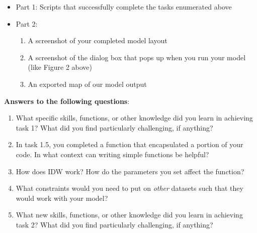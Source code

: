 \documentclass[]{article}
\providecommand{\tightlist}{%
  \setlength{\itemsep}{0pt}\setlength{\parskip}{0pt}}
\begin{document}
\begin{itemize}
\item
  Part 1: Scripts that successfully complete the tasks enumerated above
\item
  Part 2:

  \begin{enumerate}
  \def\labelenumi{\arabic{enumi}.}
  \tightlist
  \item
    A screenshot of your completed model layout
  \item
    A screenshot of the dialog box that pops up when you run your model
    (like Figure 2 above)
  \item
    An exported map of our model output
  \end{enumerate}
\end{itemize}

\textbf{Answers to the following questions}:

\begin{enumerate}
\def\labelenumi{\arabic{enumi}.}
\item
  What specific skills, functions, or other knowledge did you learn in
  achieving task 1? What did you find particularly challenging, if
  anything?
\item
  In task 1.5, you completed a function that encapsulated a portion of
  your code. In what context can writing simple functions be helpful?
\item
  How does IDW work? How do the parameters you set affect the function?
\item
  What constraints would you need to put on \emph{other} datasets such
  that they would work with your model?
\item
  What new skills, functions, or other knowledge did you learn in
  achieving task 2? What did you find particularly challenging, if
  anything?
\end{enumerate}
\end{document}
